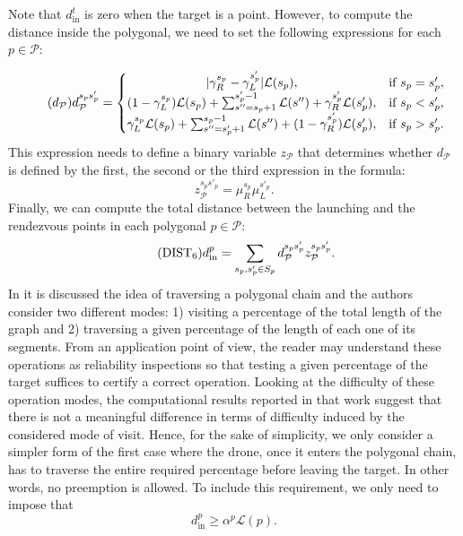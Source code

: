 Note that $d_{\text{in}}^t$ is zero when the target is a point. However, to compute the distance inside the polygonal, we need to set the following expressions for each $p\in\mathcal P$:



\begin{equation}\tag{$d_{\mathcal P}$}\label{eq:dP}
d_{\mathcal P}^{s_ps'_p} = \left\{\begin{matrix}
|\gamma_R^{s_p} - \gamma_L^{s'_p}|\mathcal L(s_p), & \text{if } s_p = s'_p,\\
(1 - \gamma_L^{s_p})\mathcal L(s_p) + \sum_{s'' = s_p+1}^{s'_p-1}\mathcal L(s'') + \gamma_{R}^{s'_p}\mathcal L(s'_p), & \text{if } s_p < s'_p, \\
\gamma_L^{s_p}\mathcal L(s_p) + \sum_{s'' = s'_p+1}^{s_p-1}\mathcal L(s'') + (1-\gamma_{R}^{s'_p})\mathcal L(s'_p), & \text{if } s_p > s'_p.
\end{matrix}\right.
\end{equation}
This expression needs to define a binary variable $z_{\mathcal P}$ that determines whether $d_{\mathcal P}$ is defined by the first, the second or the third expression in the formula:
\begin{equation*}
z_{\mathcal P}^{s_ps'_p} = \mu_R^{s_p}\mu_L^{s'_p}.
\end{equation*}
Finally, we can compute the total distance between the launching and the rendezvous points in each polygonal $p\in\mathcal P$:
\begin{equation}\tag{DIST$_{6}$} \label{eq:d6}
    d_{\text{in}}^p = \sum_{s_p,s'_p\in S_p} d_{\mathcal P}^{s_ps'_p}z_{\mathcal P}^{s_ps'_p}.    
\end{equation}
\noindent
In \cite{art:Amorosi2021,Puerto2021} it is discussed the idea of traversing a polygonal chain and the authors consider two different modes: 1) visiting a percentage of the total length of the graph and 2) traversing a given percentage of the length of each one of its segments. From an application point of view, the reader may understand these operations as reliability inspections so that testing a given percentage of the target suffices to certify a correct operation. Looking at the difficulty of these operation modes, the computational results reported in that work suggest that there is not a meaningful difference in terms of difficulty induced by the considered mode of visit. Hence, for the sake of simplicity, we only consider a simpler form of the first case where the drone, once it enters the polygonal chain, has to traverse the entire required percentage before leaving the target. In other words, no preemption is allowed. To include this requirement, we only need to impose that
\begin{equation}\label{eq:alpha-p}\tag{$\alpha-\mathcal P$}
d_{\text{in}}^p \geq \alpha^p \mathcal{L}(p).
\end{equation}

